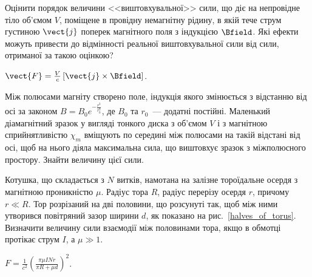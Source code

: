 \begin{problem}
    Оцінити порядок величини <<виштовхувальної>> сили, що діє на непровідне тіло об'ємом $V$, поміщене в провідну немагнітну рідину, в якій тече струм густиною $\vect{j}$ поперек магнітного поля з індукцією $\Bfield$. Які ефекти можуть привести до відмінності реальної виштовхувальної сили від сили, отриманої за такою оцінкою?
\begin{solution}
	$\vect{F} = \frac{V}{c} \left[ \vect{j}\times\Bfield\right] $.
\end{solution}
\end{problem}

\begin{problem}
    Між полюсами магніту створено поле, індукція якого змінюється з відстанню від осі за законом  $B=B_0e^{-\frac{r^3}{r_0^3}}$, де $B_0$ та $r_0$~--- додатні постійні. Маленький діамагнітний зразок у вигляді тонкого диска з об'ємом $V$ і з магнітною сприйнятливістю $\chi_m$ вміщують по середині між полюсами на такій відстані від осі, щоб на нього діяла максимальна сила, що виштовхує зразок з міжполюсного простору. Знайти величину цієї сили.
\end{problem}

\begin{problem}\label{prb:halves_of_torus}
    Котушка, що складається з $N$ витків, намотана на залізне тороїдальне осердя з магнітною проникністю $\mu$. Радіус тора $R$, радіус перерізу осердя $r$, причому $r \ll R$. Тор розрізаний на дві половини, що розсунуті так, щоб між ними утворився повітряний зазор ширини $d$, як показано на рис.~\ref{halves_of_torus}. Визначити величину сили взаємодії між половинами тора, якщо в обмотці протікає струм $I$, а $\mu \gg 1$.
\begin{solution}
	$F = \frac1{c^2}\left( \frac{\pi\mu I N r}{\pi R + \mu d}\right)^2$.
\end{solution}
\end{problem}

